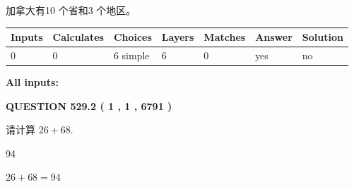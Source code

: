 \documentclass{ctexart}
\begin{document}
 
加拿大有10 个省和3 个地区。
 
 
\noindent{}
 
 
   
   
   
   
\noindent\begin{tabular}{|l|l|l|l|l|l|l|}
 \hline
Inputs & Calculates & Choices & Layers & Matches & Answer & Solution \\ \hline
 0  & 
 0  & 
 6
  simple  
  & 
 6  & 
 0  & 
  yes & 
  no 
  \\ \hline
 \end{tabular}
   
   
   
   
\noindent{}
   
   
   
   
\noindent\vspace{0.1in}\hspace{-0.08in} {\textbf{\Large{All inputs: }}}
   
   
  
\vspace{0.2in}
  
{\textbf{\Large{QUESTION
529.2 
 ( 1 , 1 , 6791 )
}}}
  
  
 
请计算 $ %
26 +  %
68 $.
 
 
 
\noindent{}
 
 

94
 
 
\noindent{}
 
 

 
 
 
\noindent{}
 
 

$ %
26 +  %
68=   %
94$
 
 
\noindent{}
 
 

 
   
   
   
\end{document}
